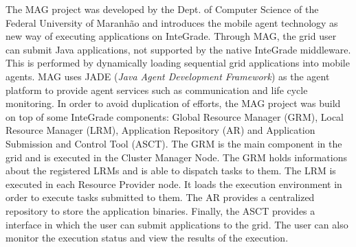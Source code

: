 \documentclass[times, 09pt, twocolumn]{article}
\begin{document}
The MAG project was developed by the Dept. of Computer Science of the Federal
University of Maranh\~{a}o and introduces the mobile agent technology as new way
of executing applications on InteGrade. Through MAG, the grid user can submit
Java applications, not supported by the native InteGrade middleware. This is
performed by dynamically loading sequential grid applications into mobile
agents. MAG uses JADE (\emph{Java Agent Development Framework}) as the agent
platform to provide agent services such as communication and life cycle
monitoring. 
In order to avoid duplication of efforts, the MAG project was build on top of
some InteGrade components: Global Resource Manager (GRM), Local Resource
Manager (LRM), Application Repository (AR) and Application Submission and
Control Tool (ASCT). The GRM is the main component in the grid and is executed
in the Cluster Manager Node. The GRM holds informations about the registered
LRMs and is able to dispatch tasks to them. The LRM is executed in
each Resource Provider node. It loads the execution environment in order to
execute tasks submitted to them. The AR provides a centralized repository to
store the application binaries. Finally, the ASCT provides a interface in which
the user can submit applications to the grid. The user can also monitor the
execution status and view the results of the execution.
\end{document}
